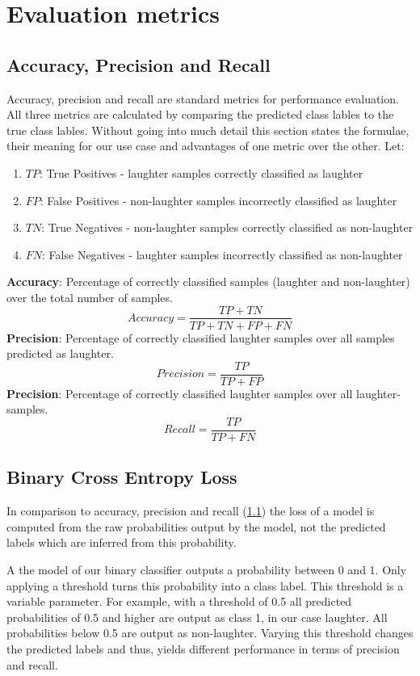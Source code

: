 \documentclass[bsc,frontabs,parskip,deptreport]{infthesis}
\begin{document}
\section{Evaluation metrics} \label{theory}
\subsection{Accuracy, Precision and Recall} \label{sec:acc-prec-rec}
Accuracy, precision and recall are standard metrics for performance evaluation.
All three metrics are calculated by comparing the predicted class lables to the true class lables.
Without going into much detail this section states the formulae, their meaning for our use case and advantages of one metric over the other.
Let:
\begin{enumerate}
    \item $TP$: True Positives - laughter samples correctly classified as laughter
    \item $FP$: False Positives - non-laughter samples incorrectly classified as laughter
    \item $TN$: True Negatives - non-laughter samples correctly classified as non-laughter
    \item $FN$: False Negatives - laughter samples incorrectly classified as non-laughter
\end{enumerate}
\textbf{Accuracy}: Percentage of correctly classified samples (laughter and non-laughter) over the total number of samples.
$$Accuracy = \frac{TP+TN}{TP+TN+FP+FN}$$
\textbf{Precision}: Percentage of correctly classified laughter samples over all samples predicted as laughter.
$$Precision = \frac{TP}{TP+FP}$$
\textbf{Precision}: Percentage of correctly classified laughter samples over all laughter-samples.
$$Recall = \frac{TP}{TP+FN}$$

\subsection{Binary Cross Entropy Loss}
In comparison to accuracy, precision and recall (\ref{sec:acc-prec-rec}) the loss of a model is computed from the raw probabilities output by the model, not the predicted labels which are inferred from this probability.

A the model of our binary classifier outputs a probability between 0 and 1. Only applying a threshold turns this probability into a class label. This threshold is a variable parameter.
For example, with a threshold of 0.5 all predicted probabilities of 0.5 and higher are output as class 1, in our case laughter. All probabilities below 0.5 are output as non-laughter. 
Varying this threshold changes the predicted labels and thus, yields different performance in terms of precision and recall. 
\end{document}
